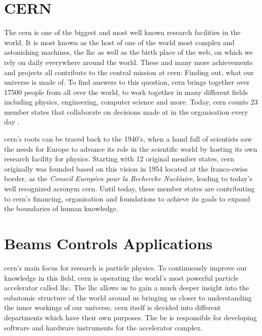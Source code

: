\section{CERN}
\label{sec:Introduction:CERN}

The \gls{cern} is one of the biggest and most well known research facilities in the world. It is most known as the host of one of the world most complex and astonishing machines, the \gls{lhc} as well as the birth place of the \gls{web}, on which we rely on daily everywhere around the world. \cite{Cern}
These and many more achievements and projects all contribute to the central mission at \gls{cern}: Finding out, what our universe is made of. To find answers to this question, \gls{cern} brings together over 17500 people from all over the world, to work together in many different fields including physics, engineering, computer science and more. Today, \gls{cern} counts 23 member states that collaborate on decisions made at in the organisation every day \cite{CernWhoWeAre}.

\gls{cern}'s roots can be traced back to the 1940's, when a hand full of scientists saw the needs for Europe to advance its role in the scientific world by hosting its own research facility for physics. Starting with 12 original member states, \gls{cern} originally was founded based on this vision in 1954 located at the franco-swiss border, as the \emph{Conseil Européen pour la Recherche Nucléaire}, leading to today's well recognized acronym \gls{cern}. Until today, these member states are contributing to \gls{cern}'s financing, organisation and foundations to achieve its goals to expand the boundaries of human knowledge. \cite{CernOurHistory}





\section{Beams Controls Applications}
\label{sec:Introduction:BE-CO-APS}

\gls{cern}'s main focus for research is particle physics. To continuously improve our knowledge in this field, \gls{cern} is operating the world's most powerful particle accelerator called \gls{lhc}. The \gls{lhc} allows us to gain a much deeper insight into the subatomic structure of the world around us bringing us closer to understanding the inner workings of our universe. \gls{cern} itself is devided into different departments which have their own purposes. The \gls{be} is responsible for developing software and hardware instruments for the accelerator complex. \cite{CernBeamsDep}


